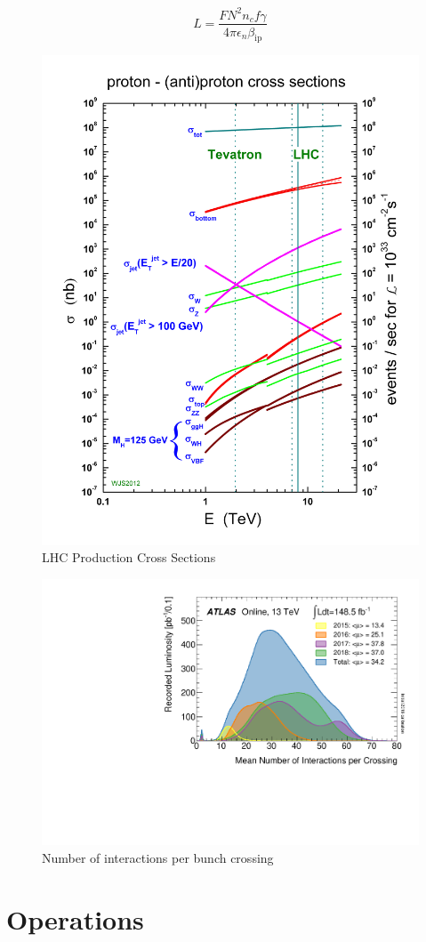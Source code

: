 \begin{equation}
L = \frac{FN^2 n_c f\gamma}{4\pi \epsilon_n \beta_{\text{ip}}}
\label{eq:lumi}
\end{equation}


\begin{figure}[htpb!]
\begin{center}
  \includegraphics[width=0.6\linewidth]{figures/LHC/crosssections2013}
\caption{LHC Production Cross Sections}
\label{fig:lhc-lhccrossection}
\end{center}
\end{figure}

\begin{figure}[htpb!]
\begin{center}
  \includegraphics[width=0.6\linewidth]{figures/LHC/mu_2015_2018}
\caption{Number of interactions per bunch crossing}
\label{fig:lhc-mu}
\end{center}
\end{figure}

\section{Operations}

